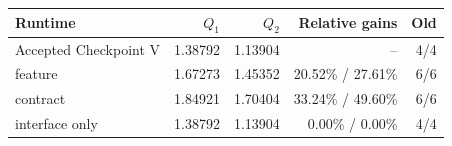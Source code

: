 \begin{tabular}{lrrrr}
\toprule
Runtime & $Q_1$ & $Q_2$ & Relative gains & Old \\
\midrule
Accepted Checkpoint V & 1.38792 & 1.13904 & -- & 4/4 \\
feature & 1.67273 & 1.45352 & 20.52\% / 27.61\% & 6/6 \\
contract & 1.84921 & 1.70404 & 33.24\% / 49.60\% & 6/6 \\
interface only & 1.38792 & 1.13904 & 0.00\% / 0.00\% & 4/4 \\
\bottomrule
\end{tabular}
